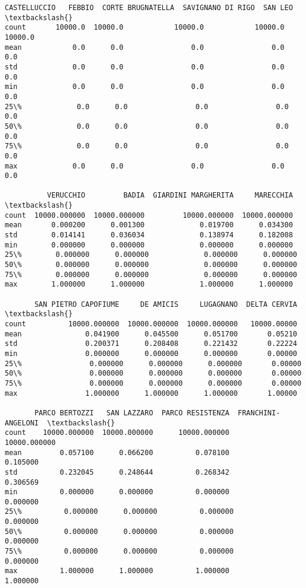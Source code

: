 \documentclass[11pt]{article}
\makeatletter
\newcommand{\boxspacing}{\kern\kvtcb@left@rule\kern\kvtcb@boxsep}
\newcommand{\prompt}[4]{
        {\ttfamily\llap{{\color{#2}[#3]:\hspace{3pt}#4}}\vspace{-\baselineskip}}
    }
\makeatother
\begin{document}
            \begin{tcolorbox}[breakable, size=fbox, boxrule=.5pt, pad at break*=1mm, opacityfill=0]
\prompt{Out}{outcolor}{23}{\boxspacing}
\begin{Verbatim}[commandchars=\\\{\}]
       CASTELLUCCIO   FEBBIO  CORTE BRUGNATELLA  SAVIGNANO DI RIGO  SAN LEO  \textbackslash{}
count       10000.0  10000.0            10000.0            10000.0  10000.0
mean            0.0      0.0                0.0                0.0      0.0
std             0.0      0.0                0.0                0.0      0.0
min             0.0      0.0                0.0                0.0      0.0
25\%             0.0      0.0                0.0                0.0      0.0
50\%             0.0      0.0                0.0                0.0      0.0
75\%             0.0      0.0                0.0                0.0      0.0
max             0.0      0.0                0.0                0.0      0.0

          VERUCCHIO         BADIA  GIARDINI MARGHERITA     MARECCHIA  \textbackslash{}
count  10000.000000  10000.000000         10000.000000  10000.000000
mean       0.000200      0.001300             0.019700      0.034300
std        0.014141      0.036034             0.138974      0.182008
min        0.000000      0.000000             0.000000      0.000000
25\%        0.000000      0.000000             0.000000      0.000000
50\%        0.000000      0.000000             0.000000      0.000000
75\%        0.000000      0.000000             0.000000      0.000000
max        1.000000      1.000000             1.000000      1.000000

       SAN PIETRO CAPOFIUME     DE AMICIS     LUGAGNANO  DELTA CERVIA  \textbackslash{}
count          10000.000000  10000.000000  10000.000000   10000.00000
mean               0.041900      0.045500      0.051700       0.05210
std                0.200371      0.208408      0.221432       0.22224
min                0.000000      0.000000      0.000000       0.00000
25\%                0.000000      0.000000      0.000000       0.00000
50\%                0.000000      0.000000      0.000000       0.00000
75\%                0.000000      0.000000      0.000000       0.00000
max                1.000000      1.000000      1.000000       1.00000

       PARCO BERTOZZI   SAN LAZZARO  PARCO RESISTENZA  FRANCHINI-ANGELONI  \textbackslash{}
count    10000.000000  10000.000000      10000.000000        10000.000000
mean         0.057100      0.066200          0.078100            0.105000
std          0.232045      0.248644          0.268342            0.306569
min          0.000000      0.000000          0.000000            0.000000
25\%          0.000000      0.000000          0.000000            0.000000
50\%          0.000000      0.000000          0.000000            0.000000
75\%          0.000000      0.000000          0.000000            0.000000
max          1.000000      1.000000          1.000000            1.000000


\end{Verbatim}
\end{tcolorbox}
\end{document}
